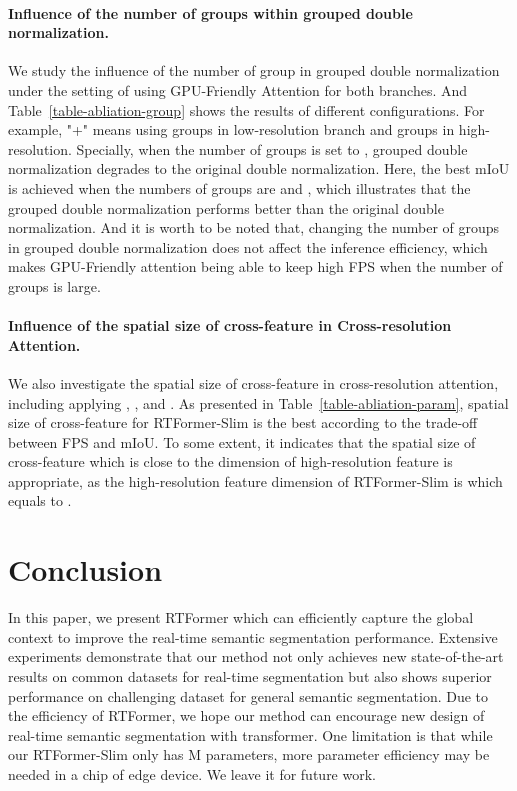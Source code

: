 \documentclass{article}
\begin{document}
\vspace{-2mm}
\paragraph{Influence of the number of groups within grouped double normalization.} 
We study the influence of the number of group in grouped double normalization under the setting of using GPU-Friendly Attention for both branches. And Table~\ref{table-abliation-group} shows the results of different configurations. For example, "+" means using  groups in low-resolution branch and  groups in high-resolution. Specially, when the number of groups is set to , grouped double normalization degrades to the original double normalization. Here, the best mIoU is achieved when the numbers of groups are  and , which illustrates that the grouped double normalization performs better than the original double normalization. And it is worth to be noted that, changing the number of groups in grouped double normalization does not affect the inference efficiency, which makes GPU-Friendly attention being able to keep high FPS when the number of groups is large.

\vspace{-2mm}
\paragraph{Influence of the spatial size of cross-feature in Cross-resolution Attention.}
We also investigate the spatial size of cross-feature in cross-resolution attention, including applying , , and . As presented in Table~\ref{table-abliation-param},  spatial size of cross-feature for RTFormer-Slim is the best according to the trade-off between FPS and mIoU. To some extent, it indicates that the spatial size of cross-feature which is close to the dimension of high-resolution feature is appropriate, as the high-resolution feature dimension of RTFormer-Slim is  which equals to .

\section{Conclusion}
In this paper, we present RTFormer which can  efficiently capture the global context to improve the real-time semantic segmentation performance. Extensive experiments demonstrate that our method not only achieves new state-of-the-art results on common datasets for real-time segmentation but also shows superior performance on challenging dataset for general semantic segmentation. Due to the efficiency of RTFormer, we hope our method can encourage new design of real-time semantic segmentation with transformer. One limitation is that while our RTFormer-Slim only has M parameters, more parameter efficiency may be needed in a chip of edge device. We leave it for future work.
\end{document}
